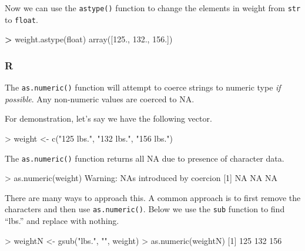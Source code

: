 \documentclass[
]{book}
\newenvironment{Shaded}{\begin{snugshade}}{\end{snugshade}}
\newcommand{\BuiltInTok}[1]{#1}
\newcommand{\ConstantTok}[1]{\textcolor[rgb]{0.00,0.00,0.00}{#1}}
\newcommand{\DecValTok}[1]{\textcolor[rgb]{0.00,0.00,0.81}{#1}}
\newcommand{\FloatTok}[1]{\textcolor[rgb]{0.00,0.00,0.81}{#1}}
\newcommand{\FunctionTok}[1]{\textcolor[rgb]{0.00,0.00,0.00}{#1}}
\newcommand{\NormalTok}[1]{#1}
\newcommand{\OperatorTok}[1]{\textcolor[rgb]{0.81,0.36,0.00}{\textbf{#1}}}
\newcommand{\OtherTok}[1]{\textcolor[rgb]{0.56,0.35,0.01}{#1}}
\newcommand{\SpecialCharTok}[1]{\textcolor[rgb]{0.00,0.00,0.00}{#1}}
\newcommand{\StringTok}[1]{\textcolor[rgb]{0.31,0.60,0.02}{#1}}
\begin{document}
Now we can use the \texttt{astype()} function to change the elements in weight from \texttt{str} to \texttt{float}.

\begin{Shaded}
\begin{Highlighting}[]
\OperatorTok{\textgreater{}}\NormalTok{ weight.astype(}\BuiltInTok{float}\NormalTok{)}
\NormalTok{array([}\FloatTok{125.}\NormalTok{, }\FloatTok{132.}\NormalTok{, }\FloatTok{156.}\NormalTok{])}
\end{Highlighting}
\end{Shaded}

\hypertarget{r-23}{%
\subsubsection*{R}\label{r-23}}

The \texttt{as.numeric()} function will attempt to coerce strings to numeric type \emph{if possible}. Any non-numeric values are coerced to NA.

For demonstration, let's say we have the following vector.

\begin{Shaded}
\begin{Highlighting}[]
\SpecialCharTok{\textgreater{}}\NormalTok{ weight }\OtherTok{\textless{}{-}} \FunctionTok{c}\NormalTok{(}\StringTok{"125 lbs."}\NormalTok{, }\StringTok{"132 lbs."}\NormalTok{, }\StringTok{"156 lbs."}\NormalTok{)}
\end{Highlighting}
\end{Shaded}

The \texttt{as.numeric()} function returns all NA due to presence of character data.

\begin{Shaded}
\begin{Highlighting}[]
\SpecialCharTok{\textgreater{}} \FunctionTok{as.numeric}\NormalTok{(weight)}
\NormalTok{Warning}\SpecialCharTok{:}\NormalTok{ NAs introduced by coercion}
\NormalTok{[}\DecValTok{1}\NormalTok{] }\ConstantTok{NA} \ConstantTok{NA} \ConstantTok{NA}
\end{Highlighting}
\end{Shaded}

There are many ways to approach this. A common approach is to first remove the characters and then use \texttt{as.numeric()}. Below we use the \texttt{sub} function to find ``lbs.'' and replace with nothing.

\begin{Shaded}
\begin{Highlighting}[]
\SpecialCharTok{\textgreater{}}\NormalTok{ weightN }\OtherTok{\textless{}{-}} \FunctionTok{gsub}\NormalTok{(}\StringTok{"lbs."}\NormalTok{, }\StringTok{""}\NormalTok{, weight)}
\SpecialCharTok{\textgreater{}} \FunctionTok{as.numeric}\NormalTok{(weightN)}
\NormalTok{[}\DecValTok{1}\NormalTok{] }\DecValTok{125} \DecValTok{132} \DecValTok{156}
\end{Highlighting}
\end{Shaded}
\end{document}
